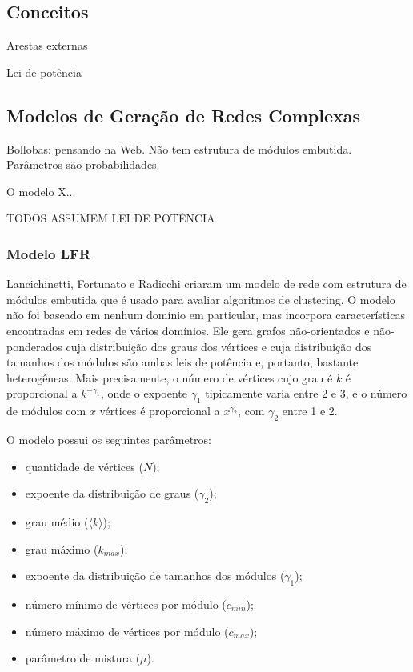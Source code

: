 \documentclass{acm_proc_article-sp}
\begin{document}
\subsection{Conceitos}

Arestas externas

Lei de potência


\subsection{Modelos de Geração de Redes Complexas}

Bollobas: pensando na Web. Não tem estrutura de módulos embutida. Parâmetros são probabilidades.

O modelo X...

TODOS ASSUMEM LEI DE POTÊNCIA

\subsubsection{Modelo LFR}

Lancichinetti, Fortunato e Radicchi \cite{Lancichinetti2008} criaram um modelo de rede com estrutura de módulos embutida que é usado para avaliar algoritmos de clustering. O modelo não foi baseado em nenhum domínio em particular, mas incorpora características encontradas em redes de vários domínios. Ele gera grafos não-orientados e não-ponderados cuja distribuição dos graus dos vértices e cuja distribuição dos tamanhos dos módulos são ambas leis de potência e, portanto, bastante heterogêneas. Mais precisamente, o número de vértices cujo grau é $k$ é proporcional a $k^{-\gamma_1}$, onde o expoente $\gamma_1$ tipicamente varia entre 2 e 3, e o número de módulos com $x$ vértices é proporcional a $x^{\gamma_2}$, com $\gamma_2$ entre 1 e 2.

O modelo possui os seguintes parâmetros:
\begin{itemize}
  \item quantidade de vértices ($N$);
  \item expoente da distribuição de graus ($\gamma_2$);
  \item grau médio ($\langle k \rangle$);
  \item grau máximo ($k_{max}$);
  \item expoente da distribuição de tamanhos dos módulos ($\gamma_1$);
  \item número mínimo de vértices por módulo ($c_{min}$);
  \item número máximo de vértices por módulo ($c_{max}$);
  \item parâmetro de mistura ($\mu$).
\end{itemize}
\end{document}
